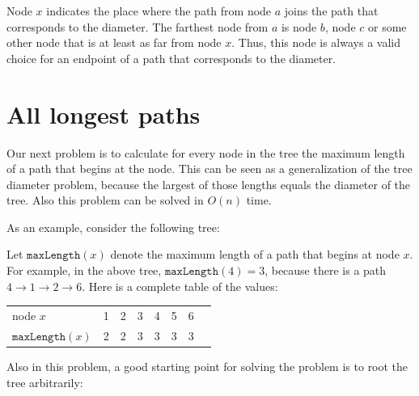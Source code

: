 Node $x$ indicates the place where the path
from node $a$ joins the path that corresponds
to the diameter.
The farthest node from $a$
is node $b$, node $c$ or some other node
that is at least as far from node $x$.
Thus, this node is always a valid choice for
an endpoint of a path that corresponds to the diameter.

\section{All longest paths}

Our next problem is to calculate for every node
in the tree the maximum length of a path
that begins at the node.
This can be seen as a generalization of the
tree diameter problem, because the largest of those
lengths equals the diameter of the tree.
Also this problem can be solved in $O(n)$ time.

As an example, consider the following tree:
\begin{center}
\end{center}

Let $\texttt{maxLength}(x)$ denote the maximum length
of a path that begins at node $x$.
For example, in the above tree,
$\texttt{maxLength}(4)=3$, because there
is a path $4 \rightarrow 1 \rightarrow 2 \rightarrow 6$.
Here is a complete table of the values:
\begin{center}
\begin{tabular}{l|lllllll}
node $x$ & 1 & 2 & 3 & 4 & 5 & 6 \\
$\texttt{maxLength}(x)$ & 2 & 2 & 3 & 3 & 3 & 3 \\
\end{tabular}
\end{center}

Also in this problem, a good starting point
for solving the problem is to root the tree arbitrarily:
\begin{center}
\end{center}

